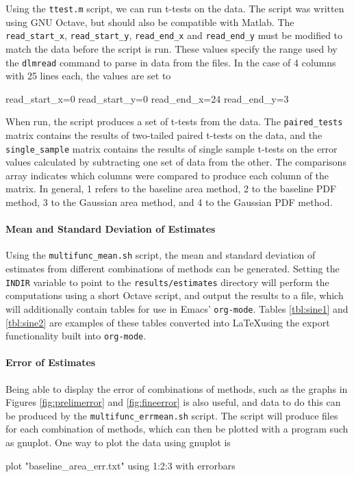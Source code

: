 \documentclass[a4paper,11pt,twoside]{article}
\begin{document}
\begin{appendices}
    Using the \texttt{ttest.m} script, we can run t-tests on the data. The script
    was written using GNU Octave, but should also be compatible with
    Matlab. The \texttt{read\_start\_x}, \texttt{read\_start\_y},
    \texttt{read\_end\_x} and \texttt{read\_end\_y} must be modified to match the
    data before the script is run. These values specify the range used by the
    \texttt{dlmread} command to parse in data from the files. In the case of 4
    columns with 25 lines each, the values are set to \small
    \begin{verbatimtab}
    read_start_x=0
    read_start_y=0
    read_end_x=24
    read_end_y=3
    \end{verbatimtab}
    \normalsize
    When run, the script produces a set of t-tests from the data. The
    \texttt{paired\_tests} matrix contains the results of two-tailed paired t-tests
    on the data, and the \texttt{single\_sample} matrix contains the results of
    single sample t-tests on the error values calculated by subtracting one set of
    data from the other. The comparisons array indicates which columns were compared
    to produce each column of the matrix. In general, 1 refers to the baseline area
    method, 2 to the baseline PDF method, 3 to the Gaussian area method, and 4 to
    the Gaussian PDF method.

    \paragraph{Mean and Standard Deviation of Estimates} Using the \texttt{multifunc\_mean.sh} script, the mean
    and standard deviation of estimates from different combinations of methods can
    be generated. Setting the \texttt{INDIR} variable to point to the
    \texttt{results/estimates} directory will perform the computations using a short
    Octave script, and output the results to a file, which will additionally contain
    tables for use in Emacs' \texttt{org-mode}. Tables \ref{tbl:sine1} and
    \ref{tbl:sine2} are examples of these tables converted into \LaTeX using the
    export functionality built into \texttt{org-mode}.

    \paragraph{Error of Estimates}
    Being able to display the error of combinations of methods, such as the graphs
    in Figures \ref{fig:prelimerror} and \ref{fig:fineerror} is also useful, and
    data to do this can be produced by the \texttt{multifunc\_errmean.sh}
    script. The script will produce files for each combination of methods, which can
    then be plotted with a program such as gnuplot. One way to plot the data using
    gnuplot is
    \small
    \begin{verbatimtab}
    plot "baseline_area_err.txt" using 1:2:3 with errorbars
    \end{verbatimtab}
    \normalsize

\end{appendices}
\end{document}
